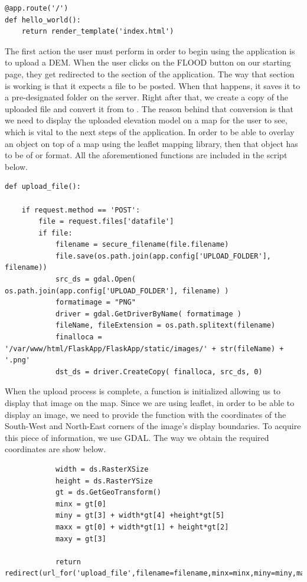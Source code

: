 \begin{lstlisting}
@app.route('/')
def hello_world():
	return render_template('index.html')
\end{lstlisting}

The first action the user must perform in order to begin using the application is to upload a DEM. When the user clicks on the FLOOD button on our starting page, they get redirected to the  section of the application. The way that section is working is that it expects a file to be posted. When that happens, it saves it to a pre-designated folder on the server. Right after that, we create a copy of the uploaded file and convert it from  to . The reason behind that conversion is that we need to display the uploaded elevation model on a map for the user to see, which is vital to the next steps of the application. In order to be able to overlay an object on top of a map using the leaflet mapping library, then that object has to be of  or  format. All the aforementioned functions are included in the script below.\\

\begin{lstlisting}
def upload_file():

	if request.method == 'POST':
		file = request.files['datafile']
		if file:
			filename = secure_filename(file.filename)
			file.save(os.path.join(app.config['UPLOAD_FOLDER'], filename))
			src_ds = gdal.Open( os.path.join(app.config['UPLOAD_FOLDER'], filename) )
			formatimage = "PNG"
			driver = gdal.GetDriverByName( formatimage )
			fileName, fileExtension = os.path.splitext(filename)
			finalloca = '/var/www/html/FlaskApp/FlaskApp/static/images/' + str(fileName) + '.png'
			dst_ds = driver.CreateCopy( finalloca, src_ds, 0)
\end{lstlisting}

When the upload process is complete, a function is initialized allowing us to display that image on the map. Since we are using leaflet, in order to be able to display an image, we need to provide the function with the coordinates of the South-West and North-East corners of the image's display boundaries. To acquire this piece of information, we use GDAL. The way we obtain the required coordinates are show below.\\

\begin{lstlisting}
			width = ds.RasterXSize
			height = ds.RasterYSize
			gt = ds.GetGeoTransform()
			minx = gt[0]
			miny = gt[3] + width*gt[4] +height*gt[5]
			maxx = gt[0] + width*gt[1] + height*gt[2]
			maxy = gt[3]

			return redirect(url_for('upload_file',filename=filename,minx=minx,miny=miny,maxx=maxx,maxy=maxy))
\end{lstlisting}\\

